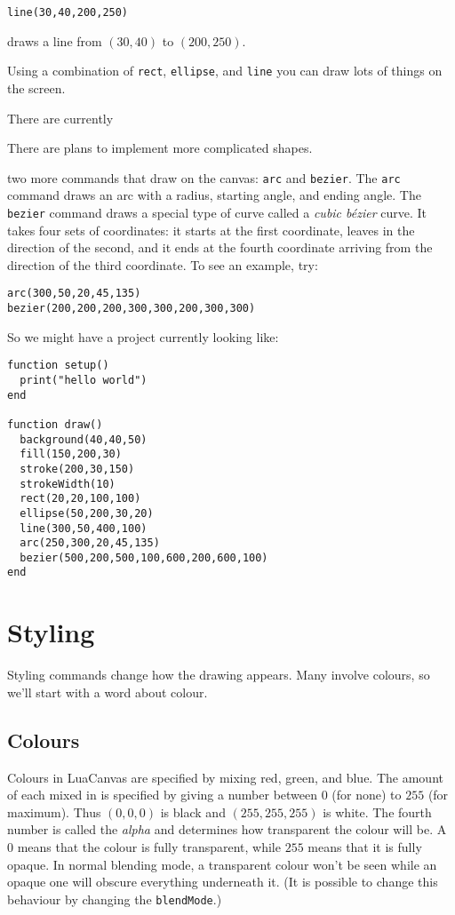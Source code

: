 \documentclass[
  xhtml,%
  use filename%
]{internet}
\begin{document}
\begin{verbatim}
line(30,40,200,250)
\end{verbatim}

\noindent draws a line from \((30,40)\) to \((200,250)\).

Using a combination of \verb+rect+, \verb+ellipse+, and \verb+line+ you can draw lots of things on the screen.

There are currently\begin{marginpar}There are plans to implement more complicated shapes.\end{marginpar} two more commands that draw on the canvas: \verb+arc+ and \verb+bezier+.
The \verb+arc+ command draws an arc with a radius, starting angle, and ending angle.
The \verb+bezier+ command draws a special type of curve called a \emph{cubic b\'ezier} curve.
It takes four sets of coordinates: it starts at the first coordinate, leaves in the direction of the second, and it ends at the fourth coordinate arriving from the direction of the third coordinate.
To see an example, try:

\begin{verbatim}
arc(300,50,20,45,135)
bezier(200,200,200,300,300,200,300,300)
\end{verbatim}

So we might have a project currently looking like:

\begin{verbatim}
function setup()
  print("hello world")
end

function draw()
  background(40,40,50)
  fill(150,200,30)
  stroke(200,30,150)
  strokeWidth(10)
  rect(20,20,100,100)
  ellipse(50,200,30,20)
  line(300,50,400,100)
  arc(250,300,20,45,135)
  bezier(500,200,500,100,600,200,600,100)
end
\end{verbatim}

\section{Styling}

Styling commands change how the drawing appears.
Many involve colours, so we'll start with a word about colour.

\subsection{Colours}

Colours in LuaCanvas are specified by mixing red, green, and blue.
The amount of each mixed in is specified by giving a number between \(0\) (for none) to \(255\) (for maximum).
Thus \((0,0,0)\) is black and \((255,255,255)\) is white.
The fourth number is called the \emph{alpha} and determines how transparent the colour will be.
A \(0\) means that the colour is fully transparent, while \(255\) means that it is fully opaque.
In normal blending mode, a transparent colour won't be seen while an opaque one will obscure everything underneath it.
(It is possible to change this behaviour by changing the \verb+blendMode+.)
\end{document}
